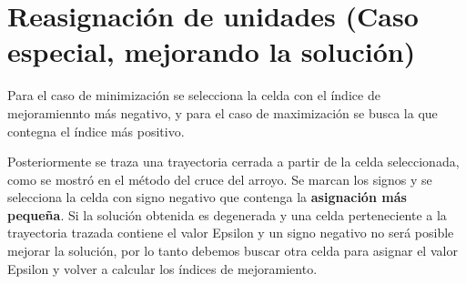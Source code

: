	\section{Reasignación de unidades \small{(Caso especial, mejorando la solución)}}
	
	Para el caso de minimización se selecciona la celda con el índice de mejoramiennto más negativo, y para el caso de maximización se busca la que contegna el índice más positivo.
	
	Posteriormente se traza una trayectoria cerrada a partir de la celda seleccionada, como se mostró en el método del cruce del arroyo. Se marcan los signos y se selecciona la celda con signo negativo que contenga la \textbf{asignación más pequeña}. Si la solución obtenida es degenerada y una celda perteneciente a la trayectoria trazada contiene el valor Epsilon y un signo negativo no será posible mejorar la solución, por lo tanto debemos buscar otra celda para asignar el valor Epsilon y volver a calcular los índices de mejoramiento.
